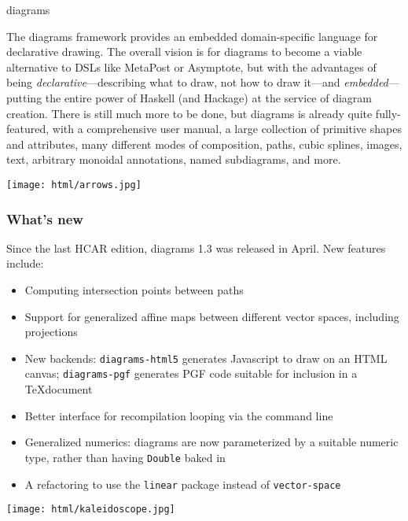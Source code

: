 \begin{hcarentry}[updated]{diagrams}

\makeheader

The diagrams framework provides an embedded domain-specific language
for declarative drawing.  The overall vision is for diagrams to become
a viable alternative to DSLs like MetaPost or Asymptote, but with the
advantages of being \emph{declarative}---describing what to draw, not
how to draw it---and \emph{embedded}---putting the entire power of
Haskell (and Hackage) at the service of diagram creation.  There is
still much more to be done, but diagrams is already quite
fully-featured, with a comprehensive user manual, a large collection
of primitive shapes and attributes, many different modes of
composition, paths, cubic splines, images, text, arbitrary monoidal
annotations, named subdiagrams, and more.

\begin{center}
\texttt{[image: html/arrows.jpg]}
\end{center}

\subsubsection*{What's new}

Since the last HCAR edition, diagrams 1.3 was released in April.
New features include:
\begin{itemize}
\item Computing intersection points between paths
\item Support for generalized affine maps between different vector
  spaces, including projections
\item New backends: \texttt{diagrams-html5} generates Javascript to draw on an
  HTML canvas; \texttt{diagrams-pgf} generates PGF code suitable for
  inclusion in a \TeX document
\item Better interface for recompilation looping via the command line
\item Generalized numerics: diagrams are now parameterized by a
  suitable numeric type, rather than having \texttt{Double} baked in
\item A refactoring to use the \texttt{linear} package instead of
  \texttt{vector-space}
\end{itemize}

\begin{center}
\texttt{[image: html/kaleidoscope.jpg]}
\end{center}


\end{hcarentry}
